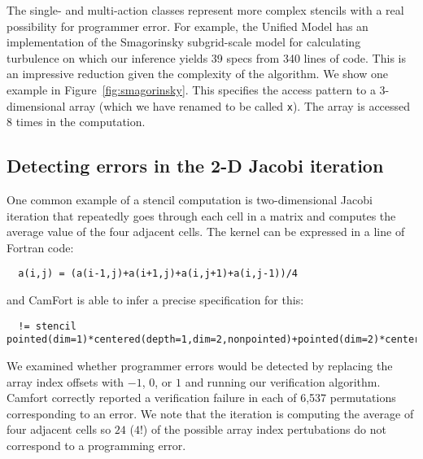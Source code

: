 \documentclass[10pt,preprint,numbers]{sigplanconf}
\theoremstyle{definition}
\begin{document}
The single- and multi-action classes represent more complex stencils
with a real possibility for programmer error. For example, the Unified
Model has an implementation of the Smagorinsky subgrid-scale model for
calculating turbulence on which our inference yields 39 specs from 340
lines of code. This is an impressive reduction given
the complexity of the algorithm.  We show one example in
Figure~\cref{fig:smagorinsky}. This specifies the access pattern to
a 3-dimensional array (which we have renamed to be called
\texttt{x}). The array is accessed 8 times in the computation.

\subsection{Detecting errors in the 2-D Jacobi iteration}

One common example of a stencil computation is two-dimensional
Jacobi iteration that repeatedly goes through each cell in a matrix
and computes the average value of the four adjacent cells. The kernel
can be expressed in a line of Fortran code:
\begin{verbatim}
  a(i,j) = (a(i-1,j)+a(i+1,j)+a(i,j+1)+a(i,j-1))/4
\end{verbatim}
and CamFort is able to infer a precise specification for this:
\begin{verbatim}
  != stencil pointed(dim=1)*centered(depth=1,dim=2,nonpointed)+pointed(dim=2)*centered(depth=1,dim=1,nonpointed)::a
\end{verbatim}

We examined whether programmer errors would be detected by replacing
the array index offsets with $-1$, $0$, or $1$ and running our
verification algorithm. Camfort correctly reported a verification
failure in each of 6,537 permutations corresponding to an error.  We
note that the iteration is computing the average of four adjacent
cells so $24$ ($4!$) of the possible array index pertubations do not
correspond to a programming error.




\end{document}
